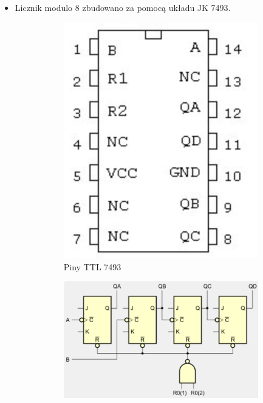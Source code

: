 \begin{itemize}
    \item Licznik modulo 8 zbudowano za pomocą układu JK 7493.
        \begin{figure}[H]
            \centering
            \begin{subfigure}[H]{0.35\textwidth}
                \includegraphics[width=\textwidth]{img/schemes/7493_pins.png}
                \caption{Piny TTL 7493}
            \end{subfigure}
            \begin{subfigure}[H]{0.6\textwidth}
                \includegraphics[width=\textwidth]{img/schemes/logic_scheme_7943.png}

\end{subfigure}
\end{figure}
\end{itemize}
